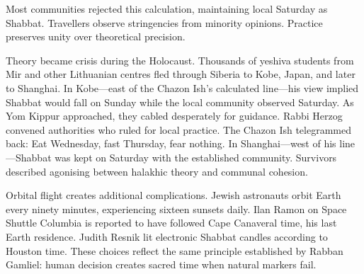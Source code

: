 Most communities rejected this calculation, maintaining local Saturday as Shabbat. Travellers observe stringencies from minority opinions. Practice preserves unity over theoretical precision.

Theory became crisis during the Holocaust. Thousands of yeshiva students from Mir and other Lithuanian centres fled through Siberia to Kobe, Japan, and later to Shanghai. In Kobe—east of the Chazon Ish's calculated line—his view implied Shabbat would fall on Sunday while the local community observed Saturday. As Yom Kippur approached, they cabled desperately for guidance. Rabbi Herzog convened authorities who ruled for local practice. The Chazon Ish telegrammed back: \QENOpen{}Eat Wednesday, fast Thursday, fear nothing.\QENClose{} In Shanghai—west of his line—Shabbat was kept on Saturday with the established community. Survivors described agonising between halakhic theory and communal cohesion. 

Orbital flight creates additional complications. Jewish astronauts orbit Earth every ninety minutes, experiencing sixteen sunsets daily. Ilan Ramon on Space Shuttle Columbia is reported to have followed Cape Canaveral time, his last Earth residence. Judith Resnik lit electronic Shabbat candles according to Houston time. These choices reflect the same principle established by Rabban Gamliel: human decision creates sacred time when natural markers fail.

